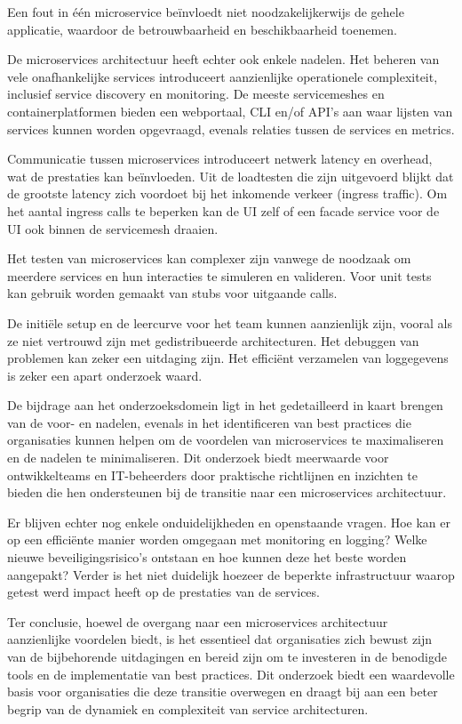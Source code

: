Een fout in één microservice beïnvloedt niet noodzakelijkerwijs de gehele applicatie, waardoor de betrouwbaarheid en beschikbaarheid toenemen.

De microservices architectuur heeft echter ook enkele nadelen. Het beheren van vele onafhankelijke services introduceert aanzienlijke operationele complexiteit, inclusief service discovery en monitoring. De meeste servicemeshes en containerplatformen bieden een webportaal, CLI en/of API’s aan waar lijsten van services kunnen worden opgevraagd, evenals relaties tussen de services en metrics.

Communicatie tussen microservices introduceert netwerk latency en overhead, wat de prestaties kan beïnvloeden. Uit de loadtesten die zijn uitgevoerd blijkt dat de grootste latency zich voordoet bij het inkomende verkeer (ingress traffic). Om het aantal ingress calls te beperken kan de UI zelf of een facade service voor de UI ook binnen de servicemesh draaien.

Het testen van microservices kan complexer zijn vanwege de noodzaak om meerdere services en hun interacties te simuleren en valideren. Voor unit tests kan gebruik worden gemaakt van stubs voor uitgaande calls.

De initiële setup en de leercurve voor het team kunnen aanzienlijk zijn, vooral als ze niet vertrouwd zijn met gedistribueerde architecturen. Het debuggen van problemen kan zeker een uitdaging zijn. Het efficiënt verzamelen van loggegevens is zeker een apart onderzoek waard.

De bijdrage aan het onderzoeksdomein ligt in het gedetailleerd in kaart brengen van de voor- en nadelen, evenals in het identificeren van best practices die organisaties kunnen helpen om de voordelen van microservices te maximaliseren en de nadelen te minimaliseren. Dit onderzoek biedt meerwaarde voor ontwikkelteams en IT-beheerders door praktische richtlijnen en inzichten te bieden die hen ondersteunen bij de transitie naar een microservices architectuur.

Er blijven echter nog enkele onduidelijkheden en openstaande vragen. Hoe kan er op een efficiënte manier worden omgegaan met monitoring en logging? Welke nieuwe beveiligingsrisico's ontstaan en hoe kunnen deze het beste worden aangepakt? Verder is het niet duidelijk hoezeer de beperkte infrastructuur waarop getest werd impact heeft op de prestaties van de services.

Ter conclusie, hoewel de overgang naar een microservices architectuur aanzienlijke voordelen biedt, is het essentieel dat organisaties zich bewust zijn van de bijbehorende uitdagingen en bereid zijn om te investeren in de benodigde tools en de implementatie van best practices. Dit onderzoek biedt een waardevolle basis voor organisaties die deze transitie overwegen en draagt bij aan een beter begrip van de dynamiek en complexiteit van service architecturen.